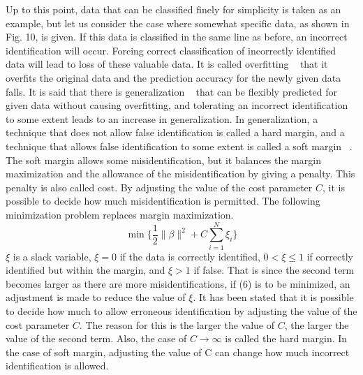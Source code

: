 Up to this point, data that can be classified finely for simplicity is taken as an example, but let us consider the case where somewhat specific data, as shown in Fig. 10, is given. If this data is classified in the same line as before, an incorrect identification will occur. Forcing correct classification of incorrectly identified data will lead to loss of these valuable data. It is called overfitting ~\cite{bib:Lessons-in-Neural-Network-Training} that it overfits the original data and the prediction accuracy for the newly given data falls. It is said that there is generalization ~\cite{bib:Generalization-in-Deep-Learning} that can be flexibly predicted for given data without causing overfitting, and tolerating an incorrect identification to some extent leads to an increase in generalization. In generalization, a technique that does not allow false identification is called a hard margin, and a technique that allows false identification to some extent is called a soft margin ~\cite{bib:An-introduction-to-kernel-based-learning-algorithms}. The soft margin allows some misidentification, but it balances the margin maximization and the allowance of the misidentification by giving a penalty. This penalty is also called cost. By adjusting the value of the cost parameter $C$, it is possible to decide how much misidentification is permitted. The following minimization problem replaces margin maximization.
\begin{equation}
\min \{\frac{1}{2}\|\beta\|^2+C\sum_{i=1}^{N}\xi_i \}
\end{equation}
$\xi$ is a slack variable, $\xi = 0$ if the data is correctly identified, $0<\xi\leq1$ if correctly identified but within the margin, and $\xi>1$ if false. That is since the second term becomes larger as there are more misidentifications, if (6) is to be minimized, an adjustment is made to reduce the value of $\xi$. It has been stated that it is possible to decide how much to allow erroneous identification by adjusting the value of the cost parameter $C$. The reason for this is the larger the value of $C$, the larger the value of the second term. Also, the case of $C \to \infty$ is called the hard margin. In the case of soft margin, adjusting the value of C can change how much incorrect identification is allowed. 

